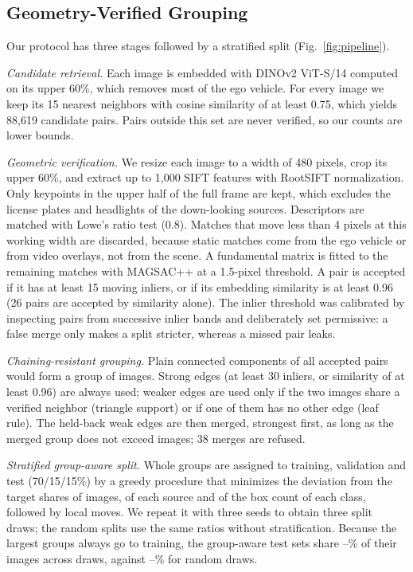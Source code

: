 \documentclass[conference,a4paper]{IEEEtran}
\begin{document}
\subsection{Geometry-Verified Grouping}
Our protocol has three stages followed by a stratified split (Fig.~\ref{fig:pipeline}).

\textit{Candidate retrieval.} Each image is embedded with DINOv2 ViT-S/14 \cite{oquab2024dinov2} computed on its upper 60\%, which removes most of the ego vehicle. For every image we keep its 15 nearest neighbors with cosine similarity of at least 0.75, which yields 88,619 candidate pairs. Pairs outside this set are never verified, so our counts are lower bounds.

\textit{Geometric verification.} We resize each image to a width of 480 pixels, crop its upper 60\%, and extract up to 1,000 SIFT features \cite{lowe2004sift} with RootSIFT normalization. Only keypoints in the upper half of the full frame are kept, which excludes the license plates and headlights of the down-looking sources. Descriptors are matched with Lowe's ratio test (0.8). Matches that move less than 4 pixels at this working width are discarded, because static matches come from the ego vehicle or from video overlays, not from the scene. A fundamental matrix is fitted to the remaining matches with MAGSAC++ \cite{barath2020magsac} at a 1.5-pixel threshold. A pair is accepted if it has at least 15 moving inliers, or if its embedding similarity is at least 0.96 (26 pairs are accepted by similarity alone). The inlier threshold was calibrated by inspecting pairs from successive inlier bands and deliberately set permissive: a false merge only makes a split stricter, whereas a missed pair leaks.

\textit{Chaining-resistant grouping.} Plain connected components of all accepted pairs would form a group of \PlainCCLargest{} images. Strong edges (at least 30 inliers, or similarity of at least 0.96) are always used; weaker edges are used only if the two images share a verified neighbor (triangle support) or if one of them has no other edge (leaf rule). The held-back weak edges are then merged, strongest first, as long as the merged group does not exceed \NDcap{} images; 38 merges are refused.

\textit{Stratified group-aware split.} Whole groups are assigned to training, validation and test (70/15/15\%) by a greedy procedure that minimizes the deviation from the target shares of images, of each source and of the box count of each class, followed by local moves. We repeat it with three seeds to obtain three split draws; the random splits use the same ratios without stratification. Because the largest groups always go to training, the group-aware test sets share \OverlapGroupLo--\OverlapGroupHi\% of their images across draws, against \OverlapRandLo--\OverlapRandHi\% for random draws.
\end{document}
